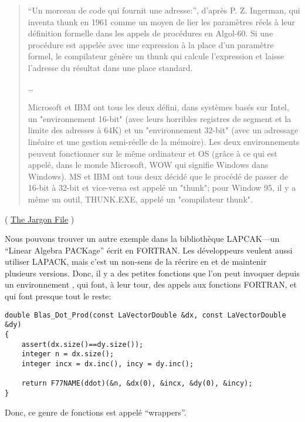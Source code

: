 \begin{framed}
\begin{quotation}
“Un morceau de code qui fournit une adresse:”, d'après P. Z. Ingerman, qui inventa
thunk en 1961 comme un moyen de lier les paramètres réels à leur définition
formelle dans les appels de procédures en Algol-60. Si une procédure est appelée
avec une expression à la place d'un paramètre formel, le compilateur génère un
thunk qui calcule l'expression et laisse l'adresse du résultat dans une place
standard.

\dots

Microsoft et IBM ont tous les deux défini, dans systèmes basés sur Intel, un
"environnement 16-bit" (avec leurs horribles registres de segment et la limite des
adresses à 64K) et un "environnement 32-bit" (avec un adressage linéaire et une
gestion semi-réelle de la mémoire). Les deux environnements peuvent fonctionner
sur le même ordinateur et OS (grâce à ce qui est appelé, dans le monde
Microsoft, WOW qui signifie Windows dans Windows). MS et IBM ont tous deux décidé
que le procédé de passer de 16-bit à 32-bit et vice-versa est appelé un "thunk";
pour Window 95, il y a même un outil, THUNK.EXE, appelé un "compilateur thunk".
\end{quotation}
\end{framed}
( \href{http://www.catb.org/jargon/html/T/thunk.html}{The Jargon File} )

Nous pouvons trouver un autre exemple dans la bibliothèque LAPCAK---un ``Linear Algebra PACKage''
écrit en FORTRAN.
Les développeurs \CCpp veulent aussi utiliser LAPACK, mais c'est un non-sens de
la récrire en \CCpp et de maintenir plusieurs versions.
Donc, il y a des petites fonctions que l'on peut invoquer depuis un environnement
\CCpp, qui font, à leur tour, des appels aux fonctions FORTRAN, et qui font
presque tout le reste:

\begin{lstlisting}[style=customc]
double Blas_Dot_Prod(const LaVectorDouble &dx, const LaVectorDouble &dy)
{
    assert(dx.size()==dy.size());
    integer n = dx.size();
    integer incx = dx.inc(), incy = dy.inc();

    return F77NAME(ddot)(&n, &dx(0), &incx, &dy(0), &incy);
}
\end{lstlisting}

Donc, ce genre de fonctions est appelé ``wrappers''.


